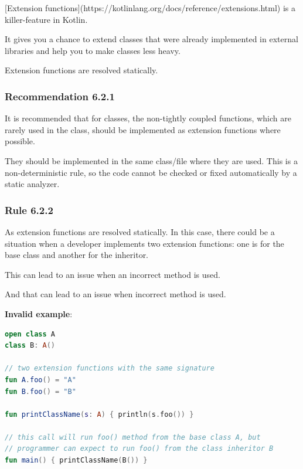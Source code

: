 {{{{[Extension functions](https://kotlinlang.org/docs/reference/extensions.html) is a killer-feature in Kotlin.

It gives you a chance to extend classes that were already implemented in external libraries and help you to make classes less heavy.

Extension functions are resolved statically.



\subsubsection*{\textbf{Recommendation 6.2.1}}
\leavevmode\newline

It is recommended that for classes, the non-tightly coupled functions, which are rarely used in the class, should be implemented as extension functions where possible.

They should be implemented in the same class/file where they are used. This is a non-deterministic rule, so the code cannot be checked or fixed automatically by a static analyzer.



\subsubsection*{\textbf{Rule 6.2.2}}
\leavevmode\newline

As extension functions are resolved statically. In this case, there could be a situation when a developer implements two extension functions: one is for the base class and another for the inheritor.

This can lead to an issue when an incorrect method is used.

And that can lead to an issue when incorrect method is used.



\textbf{Invalid example}:

\begin{lstlisting}[language=Kotlin]
open class A
class B: A()

// two extension functions with the same signature
fun A.foo() = "A"
fun B.foo() = "B"

fun printClassName(s: A) { println(s.foo()) }

// this call will run foo() method from the base class A, but
// programmer can expect to run foo() from the class inheritor B
fun main() { printClassName(B()) }
\end{lstlisting}


}}}}
